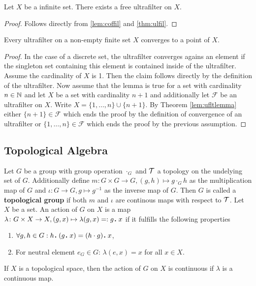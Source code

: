 \begin{col}\label{col:exfreeuf}
  Let $X$ be a infinite set. There exists a free ultrafilter on $X$.
\end{col}

\begin{proof}
  Follows directly from \ref{lem:coffil} and \ref{thm:ulfil}.
\end{proof}

\begin{lemma}
  Every ultrafilter on a non-empty finite set $X$ converges to a point of $X$.
\end{lemma}

\begin{proof}
  In the case of a discrete set, the ultrafilter converges agains an element if the singleton set containing this element is contained inside of the ultrafilter.
  Assume the cardinality of $X$ is 1. Then the claim follows directly by the definition of the ultrafilter.
  Now assume that the lemma is true for a set with cardinality $n \in \mathbb{N}$ and let $X$ be a set with cardinality $n+1$ and additionally let $\mathcal{F}$ be an ultrafilter on $X$. Write $X = \{1, \ldots, n\} \cup \{n+1\}$. By Theorem \ref{lem:ufltlemma} either $\{n+1\} \in \mathcal{F}$ which ends the proof by the definition of convergence of an ultrafilter or $\{1,\ldots,n\} \in \mathcal{F}$ which ends the proof by the previous assumption.
\end{proof}

\subsection{Topological Algebra}

\begin{defin}
  Let $G$ be a group with group operation $\cdot_G$ and $\mathcal{T}$ a topology on the undelying set of $G$. Additionally define $m\colon G \times G \to G, (g, h) \mapsto g \cdot_G h$ as the multiplication map of $G$ and $\iota\colon G \to G, g \mapsto g^{-1}$ as the inverse map of $G$. Then $G$ is called a \textbf{topological group} if both $m$ and $\iota$ are continous maps with respect to $\mathcal{T}$.
  Let $X$ be a set. An action of $G$ on $X$ is a map $\lambda\colon G\times X \to X, (g, x) \mapsto \lambda(g, x) =: g \anddot x$ if it fulfills the following properties
  \begin{enumerate}
    \item $\forall g, h \in G: h \anddot (g \anddot x) = (h \cdot g) \anddot x$,
    \item For neutral element $e_G \in G$: $\lambda(e, x) = x$ for all $x \in X$.
  \end{enumerate}
  If $X$ is a topological space, then the action of $G$ on $X$ is continuous if $\lambda$ is a continuous map.
\end{defin}

